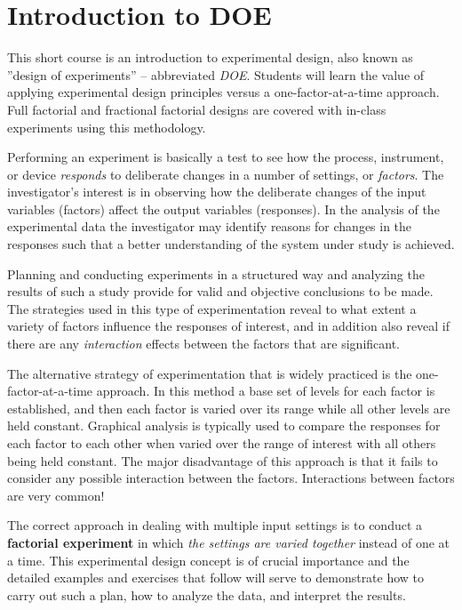 \chapter{Introduction to DOE}
This short course is an introduction to experimental design, also known as ''design of experiments'' -- abbreviated \textit{DOE}. Students will learn the value of applying experimental design principles versus a one-factor-at-a-time approach. Full factorial and fractional factorial designs are covered with in-class experiments using this methodology.

Performing an experiment is basically a test to see how the process, instrument, or device \textit{responds} to deliberate changes in a number of settings, or \textit{factors}.  The investigator's interest is in observing how the deliberate changes of the input variables (factors) affect the output variables (responses).  In the analysis of the experimental data the investigator may identify reasons for changes in the responses such that a better understanding of the system under study is achieved.

Planning and conducting experiments in a structured way and analyzing the results of such a study provide for valid and objective conclusions to be made.  The strategies used in this type of experimentation reveal to what extent a variety of factors influence the responses of interest, and in addition also reveal if there are any \textit{interaction}  effects between the factors that are significant.

The alternative strategy of experimentation that is widely practiced is the one-factor-at-a-time approach. In this method a base set of levels for each factor is established, and then each factor is varied over its range while all other levels are held constant. Graphical analysis is typically used to compare the responses for each factor to each other when varied over the range of interest with all others being held constant. The major disadvantage of this approach is that it fails to consider any possible interaction between the factors.  Interactions between factors are very common!

The correct approach in dealing with multiple input settings is to conduct a \textbf{factorial experiment} in which \textit{the settings are varied together} instead of one at a time.  This experimental design concept is of crucial importance and the detailed examples and exercises that follow will serve to demonstrate how to carry out such a plan, how to analyze the data, and interpret the results.
